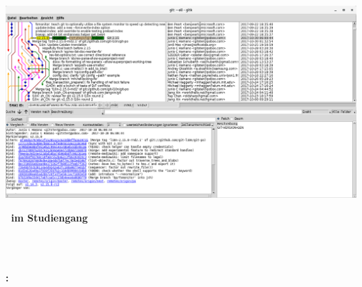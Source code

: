 \begin{titlepage}
\begin{figure}
\begin{minipage}{0.2\textwidth}
\begin{flushleft}
        \end{flushleft}
    \end{minipage}
\end{figure}
\begin{center}
\includegraphics[scale=0.20]{images/git.png}
\end{center}
\begin{center}
    \vspace*{0cm}
    \huge{\textbf{\type~im Studiengang \studypath}}
\end{center}
\begin{center}
    \vspace{1cm}
    \Huge{\textbf{\titel}}
    \vspace{1cm}
\end{center}
\begin{center}
    \vspace{1cm}
    \huge{\textbf{\autor\\}}
    \vspace{1cm}
    \LARGE{\matnr\\}
    \vspace{0,5cm}
    \LARGE{\email}
\end{center}
\vspace{1cm}
\begin{center}
    \centering
    \LARGE{\textbf{\advisor: \supervisor}} \\
\end{center}
\vspace{0.5cm}
\begin{flushright}
\end{flushright}
\begin{center}
    \small{\workgroup  \textbullet  \institute \\ \university }
\end{center}
\end{titlepage}
\restoregeometry

